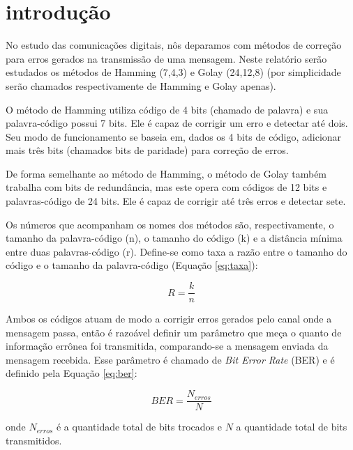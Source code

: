 \documentclass[%
aip,
jmp,%
amsmath,amssymb,
reprint,%
]{revtex4-1}
\begin{document}
	\maketitle
	
	\section{\label{sec:level1}introdu\c{c}\~ao}
	
	No estudo das comunicações digitais, nôs deparamos com métodos de correção para erros gerados na transmissão de uma mensagem. Neste relatório serão estudados os métodos de Hamming (7,4,3) e Golay (24,12,8) (por simplicidade serão chamados respectivamente de Hamming e Golay apenas).
	
	O método de Hamming utiliza código de 4 bits (chamado de palavra) e sua palavra-código possui 7 bits. Ele é capaz de corrigir um erro e detectar até dois. Seu modo de funcionamento se baseia em, dados os 4 bits de código, adicionar mais três bits (chamados bits de paridade) para correção de erros.
	
	De forma semelhante ao método de Hamming, o método de Golay também trabalha com bits de redundância, mas este opera com códigos de 12 bits e palavras-código de 24 bits. Ele é capaz de corrigir até três erros e detectar sete.
	
	Os números que acompanham os nomes dos métodos são, respectivamente, o tamanho da palavra-código (n), o tamanho do código (k) e a distância mínima entre duas palavras-código (r). Define-se como taxa a razão entre o tamanho do código e o tamanho da palavra-código (Equação \ref{eq:taxa}):
	
	\begin{equation}
		R = \frac{k}{n} \label{eq:taxa}
	\end{equation}
	
	Ambos os códigos atuam de modo a corrigir erros gerados pelo canal onde a mensagem passa, então é razoável definir um parâmetro que meça o quanto de informação errônea foi transmitida, comparando-se a mensagem enviada da mensagem recebida. Esse parâmetro é chamado de \textit{Bit Error Rate} (BER) e é definido pela Equação \ref{eq:ber}:
	
	\begin{equation}
		BER = \frac{N_{erros}}{N} \label{eq:ber}
	\end{equation}
	
	onde $N_{erros}$ é a quantidade total de bits trocados e $N$ a quantidade total de bits transmitidos.
	
\end{document}

